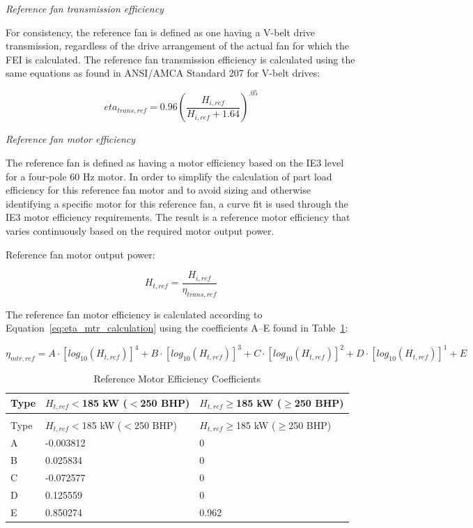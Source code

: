 \emph{Reference fan transmission efficiency}

For consistency, the reference fan is defined as one having a V-belt drive transmission, regardless of the drive arrangement of the actual fan for which the FEI is calculated. The reference fan transmission efficiency is calculated using the same equations as found in ANSI/AMCA Standard 207 for V-belt drives:

\begin{equation}
eta_{trans,ref}=0.96(\frac{H_{i,ref}}{H_{i,ref}+1.64})^{.05}
\label{eq:eta_trans_calculation}
\end{equation}

\emph{Reference fan motor efficiency}

The reference fan is defined as having a motor efficiency based on the IE3 level for a four-pole 60 Hz motor. In order to simplify the calculation of part load efficiency for this reference fan motor and to avoid sizing and otherwise identifying a specific motor for this reference fan, a curve fit is used through the IE3 motor efficiency requirements. The result is a reference motor efficiency that varies continuously based on the required motor output power.

Reference fan motor output power:

\begin{equation}
H_{t,ref}=\frac{H_{i,ref}}{\eta_{trans,ref}}
\label{eq:eta_ref_calculation}
\end{equation}

The reference fan motor efficiency is calculated according to Equation~\ref{eq:eta_mtr_calculation} using the coefficients A–E found in Table~\ref{table:reference-motor-efficiency-coefficients}:

\begin{equation}
\eta_{mtr,ref} = A\cdot[log_{10} (H_{t,ref})]^4 + B\cdot[log_{10} (H_{t,ref})]^3 +C\cdot[log_{10} (H_{t,ref})]^2 +D\cdot[log_{10} (H_{t,ref})]^1 + {E}
\label{eq:eta_mtr_calculation}
\end{equation}

\begin{longtable}[c]{p{1.0in}p{1.5in}p{1.5in}}
\caption{Reference Motor Efficiency Coefficients \label{table:reference-motor-efficiency-coefficients}} \tabularnewline
\toprule
Type & \(H_{t,ref}\)$<$185 kW ($<$250 BHP) & \(H_{t,ref}\)$\geq$185 kW ($\geq$250 BHP) \tabularnewline \midrule
\midrule
\endfirsthead

\caption[]{Reference Motor Efficiency Coefficients} \tabularnewline
\toprule
Type & \(H_{t,ref}\)$<$185 kW ($<$250 BHP) & \(H_{t,ref}\)$\geq$185 kW ($\geq$250 BHP) \tabularnewline \midrule
\midrule
\endhead

A & -0.003812 & 0 \tabularnewline
B & 0.025834 & 0 \tabularnewline
C & -0.072577 & 0 \tabularnewline
D & 0.125559 & 0 \tabularnewline
E & 0.850274 & 0.962 \tabularnewline
\bottomrule
\end{longtable}


